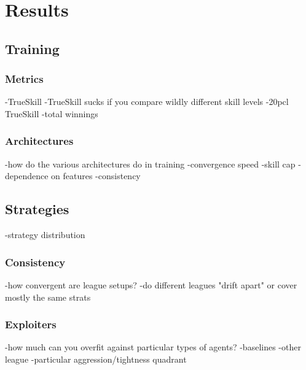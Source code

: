 \chapter{Results}

\section{Training}
\subsection{Metrics}
-TrueSkill
    -TrueSkill sucks if you compare wildly different skill levels
-20pcl ~ TrueSkill
-total winnings
\subsection{Architectures}
-how do the various architectures do in training
    -convergence speed
    -skill cap
    -dependence on features
    -consistency
\section{Strategies}
-strategy distribution
\subsection{Consistency}
-how convergent are league setups?
    -do different leagues "drift apart" or cover mostly the same strats
\subsection{Exploiters}
-how much can you overfit against particular types of agents?
    -baselines
    -other league
    -particular aggression/tightness quadrant